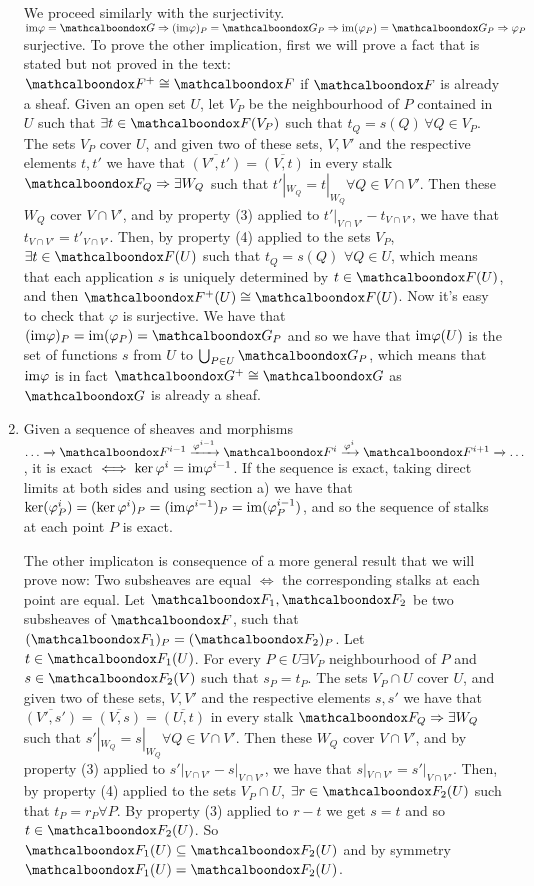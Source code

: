 \begin{sol}
\begin{enumerate}[label=\alph*)]
		We proceed similarly with the surjectivity. $\ima \varphi = \sG \imp (\ima \varphi)_P = \sG_P \imp \ima (\varphi_P) = \sG_P \imp \varphi_P$ surjective. To prove the other implication, first we will prove a fact that is stated but not proved in the text: $\sF^{+} \cong \sF$ if $\sF$ is already a sheaf. Given an open set $U$, let $V_P$ be the neighbourhood of $P$ contained in $U$ such that $\exists t \in \sF(V_P)$ such that $t_Q = s(Q) \, \forall Q \in V_P$. The sets $V_P$ cover $U$, and given two of these sets, $V,V'$ and the respective elements $t,t'$ we have that $\overline{(V',t')} = \overline{(V,t)}$ in every stalk $\sF_Q \imp \exists W_Q$ such that $t'|_{W_Q} = t|_{W_Q} \forall Q \in V \cap V'$. Then these $W_Q$ cover $V \cap V'$, and by property (3) applied to $t'|_{V\cap V'}-t_{V\cap V'}$, we have that $t_{V\cap V'} = t'_{V \cap V'}$. Then, by property (4) applied to the sets $V_P$, $\exists t \in \sF(U)$ such that $t_Q = s(Q) \, \, \forall Q \in U$, which means that each application $s$ is uniquely determined by $t \in \sF(U)$, and then $\sF^{+}(U) \cong \sF(U)$. Now it's easy to check that $\varphi$ is surjective. We have that $(\ima \varphi)_P = \ima (\varphi_P) = \sG_P$ and so we have that $\mathrm{im} \varphi (U)$ is the set of functions $s$ from $U$ to $\bigcup_{P \in U} \sG_P$, which means that $\mathrm{im} \varphi$ is in fact $\sG^{+} \cong \sG$ as $\sG$ is already a sheaf.

		\item Given a sequence of sheaves and morphisms $\dots \xrightarrow[]{} \sF^{i-1} \xrightarrow[]{\varphi^{i-1}} \sF^{i} \xrightarrow[]{\varphi^{i}} \sF^{i+1} \xrightarrow[]{} \dots$, it is exact $\iff \ker \varphi^{i} = \mathrm{im} \varphi^{i-1}$. If the sequence is exact, taking direct limits at both sides and using section a) we have that $\ker (\varphi^{i}_P) = (\ker \varphi^{i})_P = (\mathrm{im} \varphi^{i-1})_P = \mathrm{im} (\varphi^{i-1}_P) $, and so the sequence of stalks at each point $P$ is exact.

		The other implicaton is consequence of a more general result that we will prove now: Two subsheaves are equal $\iff$ the corresponding stalks at each point are equal. Let $\sF_1, \sF_2$ be two subsheaves of $\sF$, such that $(\sF_1)_P = (\sF_2)_P$. Let $t \in \sF_1(U)$. For every $P \in U \exists V_P$ neighbourhood of $P$ and $s \in \sF_2(V)$ such that $s_P = t_P$. The sets $V_P \cap U$ cover $U$, and given two of these sets, $V,V'$ and the respective elements $s,s'$ we have that $\overline{(V',s')} = \overline{(V,s)} = \overline{(U,t)}$ in every stalk $\sF_Q \imp \exists W_Q$ such that $s'|_{W_Q} = s|_{W_Q} \forall Q \in V \cap V'$. Then these $W_Q$ cover $V \cap V'$, and by property (3) applied to $s'|_{V\cap V'}-s|_{V\cap V'}$, we have that $s|_{V\cap V'} = s'|_{V \cap V'}$. Then, by property (4) applied to the sets $V_P \cap U$, $\exists r \in \sF_2(U)$ such that $t_P = r_P \forall P$. By property (3) applied to $r-t$ we get $s = t$ and so $t \in \sF_2(U)$. So $\sF_1(U) \subseteq \sF_2(U)$ and by symmetry $\sF_1(U) = \sF_2(U)$.
	\end{enumerate}
\end{sol}

